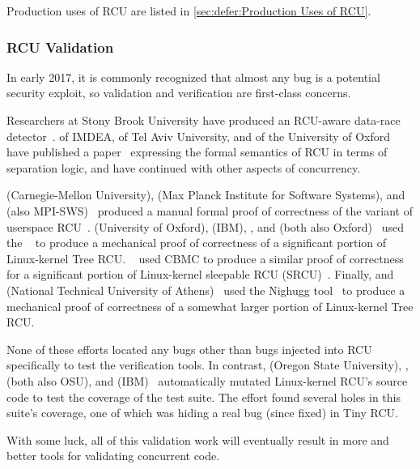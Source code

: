Production uses of RCU are listed in
\cref{sec:defer:Production Uses of RCU}.

\subsubsection{RCU Validation}
\label{sec:defer:RCU Validation}

In early 2017, it is commonly recognized that almost any bug is a potential
security exploit, so validation and verification are first-class concerns.

Researchers at Stony Brook University have produced an RCU-aware data-race
detector~\cite{AbhinavDuggal2010Masters,JustinSeyster2012PhD,Seyster:2011:RFA:2075416.2075425}.
 of IMDEA,  of Tel Aviv University,
and  of the University of Oxford have published a
paper~\cite{AlexeyGotsman2012VerifyGraceExtended} expressing the formal
semantics of RCU in terms of separation logic, and have continued with
other aspects of concurrency.

 (Carnegie-Mellon University),  (Max
Planck Institute for Software Systems), and 
(also MPI-SWS)~\cite{JosephTassarotti2015RCUproof}
produced a manual formal proof of correctness of the 
variant of userspace
RCU~\cite{MathieuDesnoyers2009URCU,MathieuDesnoyers2012URCU}.
 (University of Oxford),  (IBM),
, and 
(both also Oxford)~\cite{LihaoLiang2016VerifyTreeRCU}
used the ~\cite{EdmundClarke2004CBMC}
to produce a mechanical proof of correctness of a significant portion
of Linux-kernel Tree RCU\@.
~\cite{LanceRoy2017CBMC-SRCU} used CBMC to produce a similar
proof of correctness for a significant portion of Linux-kernel
sleepable RCU (SRCU)~\cite{PaulEMcKenney2006c}.
Finally,  and 
(National Technical University of
Athens)~\cite{MichalisKokologiannakis2017NidhuggRCU,MichalisKokologiannakis2019RCUstatelessModelCheck}
used the Nighugg tool~\cite{CarlLeonardsson2014Nidhugg}
to produce a mechanical proof of correctness of a somewhat larger
portion of Linux-kernel Tree RCU\@.

None of these efforts located any bugs other than bugs injected into
RCU specifically to test the verification tools.
In contrast,
 (Oregon State University), ,
 (both also OSU), and 
(IBM)~\cite{Groce:2015:VMC:2916135.2916190}
automatically mutated Linux-kernel RCU's source code to test the
coverage of the  test suite.
The effort found several holes in this suite's coverage, one of which
was hiding a real bug (since fixed) in Tiny RCU\@.

With some luck, all of this validation work will eventually result in
more and better tools for validating concurrent code.
